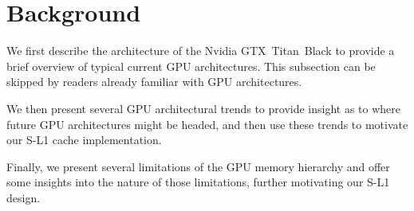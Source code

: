 \section{Background}
\label{sec:background}
We first describe the architecture of the Nvidia GTX~Titan~Black to provide a brief overview of typical
current GPU architectures.
This subsection can be skipped by readers already familiar with GPU architectures.

We then present several GPU architectural trends to provide insight as to where future GPU
architectures might be headed, and then use these trends to motivate our S-L1 cache implementation.

Finally, we present several limitations of the GPU memory hierarchy and offer some
insights into the nature of those limitations, further motivating our S-L1 design.




% 
